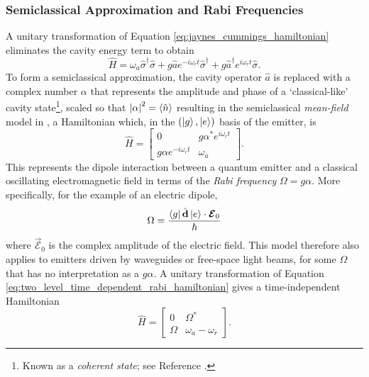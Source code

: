 \subsubsection{\label{ssubs:semiclassical_light_matter}Semiclassical Approximation and Rabi Frequencies}
A unitary transformation of Equation \ref{eq:jaynes_cummings_hamiltonian} eliminates the cavity energy term to obtain
\begin{equation}
    \hat{H} = \omega_a\hat{\sigma}^\dagger\hat{\sigma} + g\hat{a}e^{-i\omega_rt} \hat{\sigma}^\dagger + g\hat{a}^\dagger e^{i\omega_rt} \hat{\sigma}.
\end{equation}
To form a semiclassical approximation, the cavity operator $\hat{a}$ is replaced with a complex number $\alpha$ that represents the amplitude and phase of a `classical-like' cavity state\footnote{Known as a \textit{coherent state}; see Reference \cite{gerry_knight_book}.}, scaled so that $\left|\alpha\right|^2 = \left\langle{\hat{n}}\right\rangle$ resulting in the semiclassical \textit{mean-field} model in \cite{walls_milburn_book}, a Hamiltonian which, in the $(\left|g\right\rangle, \left|e\right\rangle)$ basis of the emitter, is
\begin{equation}
    \hat{H} =
    \begin{bmatrix}
        0 & g\alpha^* e^{i\omega_rt}\\
        g\alpha e^{-i\omega_rt} & \omega_a
    \end{bmatrix}. \label{eq:two_level_time_dependent_rabi_hamiltonian}
\end{equation}
This represents the dipole interaction between a quantum emitter and a classical oscillating electromagnetic field in terms of the \textit{Rabi frequency} $\Omega = g\alpha$. More specifically, for the example of an electric dipole,
\begin{equation}
    \Omega = \frac{\left\langle g\right|\hat{\boldsymbol{\mathbf{d}}}\left|e\right\rangle \cdot \boldsymbol{\mathbf{\mathcal{E}}}_0}{\hbar} \label{eq:rabi_frequency_dipole_moment}
\end{equation}
where $\vec{\mathcal{E}}_0$ is the complex amplitude of the electric field. This model therefore also applies to emitters driven by waveguides or free-space light beams, for some $\Omega$ that has no interpretation as a $g\alpha$. A unitary transformation of Equation \ref{eq:two_level_time_dependent_rabi_hamiltonian} gives a time-independent Hamiltonian
\begin{equation}
    \hat{H} =
    \begin{bmatrix}
        0 & \Omega^*\\
        \Omega & \omega_a-\omega_r
    \end{bmatrix}. \label{eq:two_level_time_independent_rabi_hamiltonian}
\end{equation}
